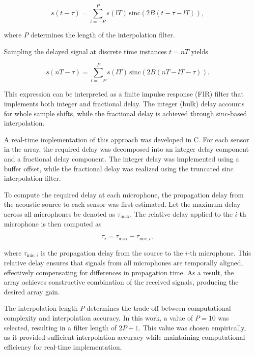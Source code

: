 \begin{equation}
s(t - \tau) = \sum_{l=-P}^{P} s(lT) \, \text{sinc}\left(2B(t - \tau - lT)\right),
\end{equation}

where $P$ determines the length of the interpolation filter.

Sampling the delayed signal at discrete time instances $t = nT$ yields

\begin{equation}
s(nT - \tau) = \sum_{l=-P}^{P} s(lT) \, \text{sinc}\left(2B(nT - lT - \tau)\right).
\end{equation}

This expression can be interpreted as a finite impulse response (FIR) filter that implements both integer and fractional delay. The integer (bulk) delay accounts for whole sample shifts, while the fractional delay is achieved through sinc-based interpolation.

A real-time implementation of this approach was developed in C. For each sensor in the array, the required delay was decomposed into an integer delay component and a fractional delay component. The integer delay was implemented using a buffer offset, while the fractional delay was realized using the truncated sinc interpolation filter.

To compute the required delay at each microphone, the propagation delay from the acoustic source to each sensor was first estimated. Let the maximum delay across all microphones be denoted as $\tau_{\text{max}}$. The relative delay applied to the $i$-th microphone is then computed as

\begin{equation}
\tau_i = \tau_{\text{max}} - \tau_{\text{mic},i},
\end{equation}

where $\tau_{\text{mic},i}$ is the propagation delay from the source to the $i$-th microphone. This relative delay ensures that signals from all microphones are temporally aligned, effectively compensating for differences in propagation time. As a result, the array achieves constructive combination of the received signals, producing the desired array gain.

The interpolation length $P$ determines the trade-off between computational complexity and interpolation accuracy. In this work, a value of $P = 10$ was selected, resulting in a filter length of $2P + 1$. This value was chosen empirically, as it provided sufficient interpolation accuracy while maintaining computational efficiency for real-time implementation.

